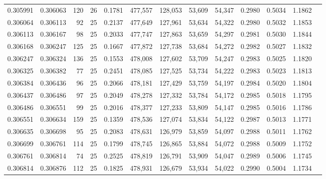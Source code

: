\begin{tabular}{rrrrrrrrrrrrr}
0.305991 & 0.306063 &   120 &  26 &                                     0.1781 & 477,557 & 128,053 &  53,609 &  54,347 & 0.2980 & 0.5034 & 1.1862 \\
0.306064 & 0.306113 &    92 &  25 &                                     0.2137 & 477,649 & 127,961 &  53,634 &  54,322 & 0.2980 & 0.5032 & 1.1853 \\
0.306113 & 0.306167 &    98 &  25 &                                     0.2033 & 477,747 & 127,863 &  53,659 &  54,297 & 0.2981 & 0.5030 & 1.1844 \\
0.306168 & 0.306247 &   125 &  25 &                                     0.1667 & 477,872 & 127,738 &  53,684 &  54,272 & 0.2982 & 0.5027 & 1.1832 \\
0.306247 & 0.306324 &   136 &  25 &                                     0.1553 & 478,008 & 127,602 &  53,709 &  54,247 & 0.2983 & 0.5025 & 1.1820 \\
0.306325 & 0.306382 &    77 &  25 &                                     0.2451 & 478,085 & 127,525 &  53,734 &  54,222 & 0.2983 & 0.5023 & 1.1813 \\
0.306384 & 0.306436 &    96 &  25 &                                     0.2066 & 478,181 & 127,429 &  53,759 &  54,197 & 0.2984 & 0.5020 & 1.1804 \\
0.306437 & 0.306486 &    97 &  25 &                                     0.2049 & 478,278 & 127,332 &  53,784 &  54,172 & 0.2985 & 0.5018 & 1.1795 \\
0.306486 & 0.306551 &    99 &  25 &                                     0.2016 & 478,377 & 127,233 &  53,809 &  54,147 & 0.2985 & 0.5016 & 1.1786 \\
0.306551 & 0.306634 &   159 &  25 &                                     0.1359 & 478,536 & 127,074 &  53,834 &  54,122 & 0.2987 & 0.5013 & 1.1771 \\
0.306635 & 0.306698 &    95 &  25 &                                     0.2083 & 478,631 & 126,979 &  53,859 &  54,097 & 0.2988 & 0.5011 & 1.1762 \\
0.306699 & 0.306761 &   114 &  25 &                                     0.1799 & 478,745 & 126,865 &  53,884 &  54,072 & 0.2988 & 0.5009 & 1.1752 \\
0.306761 & 0.306814 &    74 &  25 &                                     0.2525 & 478,819 & 126,791 &  53,909 &  54,047 & 0.2989 & 0.5006 & 1.1745 \\
0.306814 & 0.306876 &   112 &  25 &                                     0.1825 & 478,931 & 126,679 &  53,934 &  54,022 & 0.2990 & 0.5004 & 1.1734 \\

\end{tabular}

